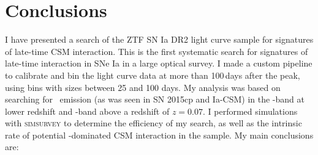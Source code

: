 \documentclass[a4paper,oneside,12pt, class=Latex/Classes/PhDthesisPSnPDF, crop=false]{standalone}
\begin{document}
\section{Conclusions}
\label{DR2_conclusion}
I have presented a search of the ZTF SN Ia DR2 light curve sample for signatures of late-time CSM interaction. This is the first systematic search for signatures of late-time interaction in SNe Ia in a large optical survey. I made a custom pipeline to calibrate and bin the light curve data at more than 100\,days after the peak, using bins with sizes between 25 and 100 days. My analysis was based on searching for \Halpha~emission (as was seen in SN 2015cp and Ia-CSM) in the \ztfr-band at lower redshift and \ztfi-band above a redshift of $z = 0.07$. I performed simulations with \textsc{simsurvey} to determine the efficiency of my search, as well as the intrinsic rate of potential \Halpha-dominated CSM interaction in the sample. My main conclusions are:
\end{document}
